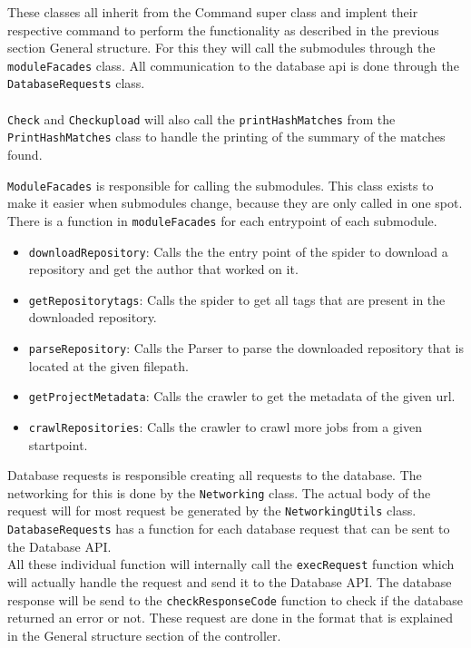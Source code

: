 \documentclass[../Main.tex]{subfiles}
\begin{document}
These classes all inherit from the Command super class and implent their respective command to perform the functionality as described in the previous section General structure. For this they will call the submodules through the \texttt{moduleFacades} class. All communication to the database api is done through the \texttt{DatabaseRequests} class.\\\\
\texttt{Check} and \texttt{Checkupload} will also call the \texttt{printHashMatches} from the \texttt{PrintHashMatches} class to handle the printing of the summary of the matches found.

\texttt{ModuleFacades} is responsible for calling the submodules. This class exists to make it easier when submodules change, because they are only called in one spot. There is a function in \texttt{moduleFacades} for each entrypoint of each submodule.
\begin{itemize}
    \item \texttt{downloadRepository}: Calls the the entry point of the spider to download a repository and get the author that worked on it.
    \item \texttt{getRepositorytags}: Calls the spider to get all tags that are present in the downloaded repository.
    \item \texttt{parseRepository}: Calls the Parser to parse the downloaded repository that is located at the given filepath.
    \item \texttt{getProjectMetadata}: Calls the crawler to get the metadata of the given url.
    \item \texttt{crawlRepositories}: Calls the crawler to crawl more jobs from a given startpoint.
\end{itemize}

Database requests is responsible creating all requests to the database. The networking for this is done by the \texttt{Networking} class. The actual body of the request will for most request be generated by the \texttt{NetworkingUtils} class. \texttt{DatabaseRequests} has a function for each database request that can be sent to the Database API.\\ All these individual function will internally call the \texttt{execRequest} function which will actually handle the request and send it to the Database API. The database response will be send to the \texttt{checkResponseCode} function to check if the database returned an error or not. These request are done in the format that is explained in the General structure section of the controller.
\end{document}
